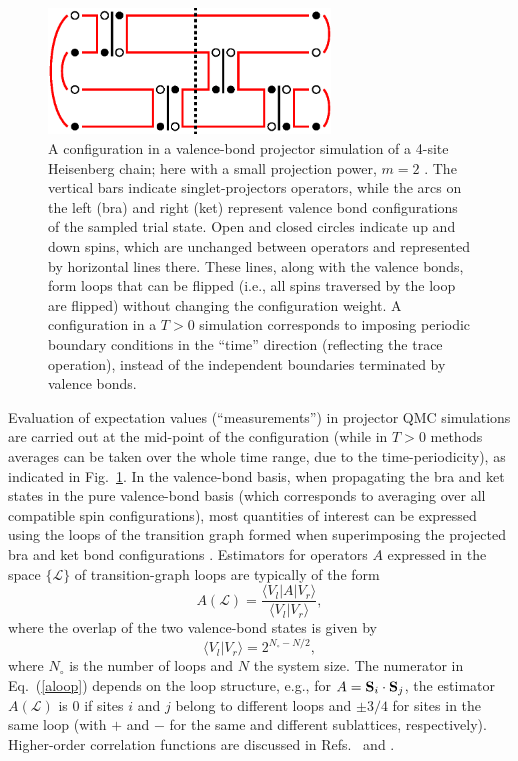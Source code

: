 \documentclass[10pt,pre,aps,twocolumn,showpacs,superscriptaddress,floatfix]{revtex4-1}
\begin{document}
\begin{figure}
\includegraphics[width=7.5cm, clip]{fig01.eps}
\caption{A configuration in a valence-bond projector simulation of a 4-site Heisenberg chain; here with a small projection power, 
$m=2$ \cite{Sandvik10a}. The vertical bars indicate singlet-projectors operators, while the arcs on the left (bra) and right (ket) represent 
valence bond configurations of the sampled trial state. Open and closed circles indicate up and down spins, which are unchanged between 
operators and represented by horizontal lines there. These lines, along with the valence bonds, form loops that can be flipped (i.e., 
all spins traversed by the loop are flipped) without changing the configuration weight. A configuration in a $T>0$ simulation corresponds 
to imposing periodic boundary conditions in the ``time'' direction (reflecting the trace operation), instead of the independent boundaries 
terminated by valence bonds.}
\label{loops}
\end{figure}

Evaluation of expectation values (``measurements'') in projector QMC simulations are carried out at the mid-point of the configuration (while in $T>0$
methods averages can be taken over the whole time range, due to the time-periodicity), as indicated 
in Fig.~\ref{loops}. In the valence-bond basis, when propagating the bra and ket states in the pure valence-bond basis (which corresponds to averaging 
over all compatible spin configurations), most quantities of interest can be expressed using the loops of the transition graph formed when superimposing 
the projected bra and ket bond configurations \cite{Liang88,Sutherland88}. Estimators for operators $A$ expressed in the space $\{\mathcal{L}\}$ of 
transition-graph loops are typically of the form
\begin{equation}
A(\mathcal{L}) = \frac{\langle V_l|A|V_r\rangle}{\langle V_l|V_r \rangle},
\label{aloop}
\end{equation}
where the overlap of the two valence-bond states is given by
\begin{equation}
\langle V_l|V_r\rangle = 2^{N_\circ - N/2},
\label{vboverlap}
\end{equation}
where $N_\circ$ is the number of loops and $N$ the system size. The numerator in Eq.~(\ref{aloop}) depends on the loop structure, 
e.g., for $A={\bf S}_i \cdot {\bf S}_j$, the estimator $A(\mathcal{L})$ is $0$ if sites $i$ and $j$ belong to different loops and $\pm 3/4$ for 
sites in the same loop (with $+$ and $-$ for the same and different sublattices, respectively). Higher-order correlation functions are discussed 
in Refs.~\cite{Beach06} and \cite{Tang11b}.
\end{document}
